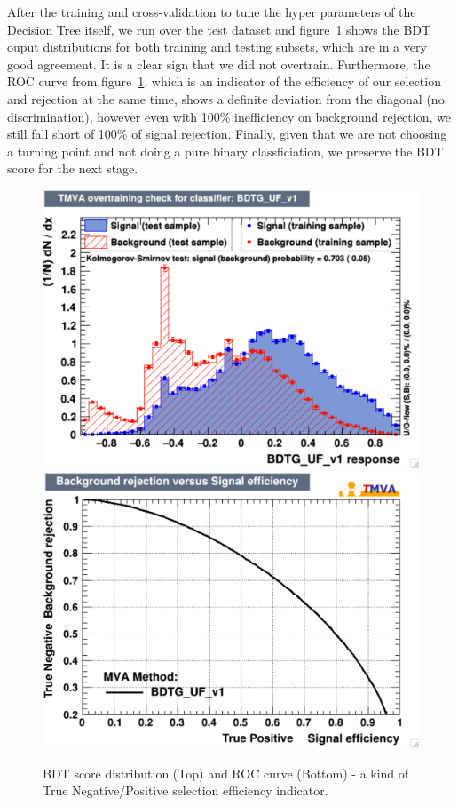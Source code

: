 After the training and cross-validation to tune the hyper parameters of the Decision Tree itself, we run over the test dataset and figure~\ref{fig:higgs_categorization_bdtoutputroc} shows the BDT ouput distributions for both training and testing subsets, which are in a very good agreement. It is a clear sign that we did not overtrain. Furthermore, the ROC curve from figure~\ref{fig:higgs_categorization_bdtoutputroc}, which is an indicator of the efficiency of our selection and rejection at the same time, shows a definite deviation from the diagonal (no discrimination), however even with 100\% inefficiency on background rejection, we still fall short of 100\% of signal rejection. Finally, given that we are not choosing a turning point and not doing a pure binary classficiation, we preserve the BDT score for the next stage.
\begin{figure}[hbp]
  \centering
  \includegraphics[width=0.75\linewidth]{figures/bdt_training/BDT_out_ge0j_all.pdf}\\
  \includegraphics[width=0.75\linewidth]{figures/bdt_training/BDT_ROC_ge0j_all.pdf}
  \caption{BDT score distribution (Top) and ROC curve (Bottom) - a kind of True Negative/Positive selection efficiency indicator.}
  \label{fig:higgs_categorization_bdtoutputroc}
\end{figure}

